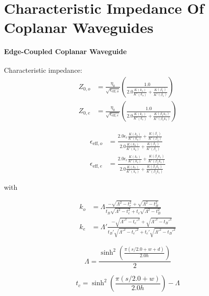 \section{Characteristic Impedance Of Coplanar Waveguides} \label{app:waveguides}
\paragraph{Edge-Coupled Coplanar Waveguide}

Characteristic impedance\cite[~p197-198]{wadell}: 
\begin{align}
	Z_{0,o} &= \frac{\eta_0}{\sqrt{\epsilon_{\text{eff},o}}} \left( \frac{1.0}{2.0 \frac{K(k_o)}{K'(k_o)} + \frac{K(\beta_1)}{K'(\beta_1)}}\right)\\
	Z_{0,e} &= \frac{\eta_0}{\sqrt{\epsilon_{\text{eff},e}}} \left( \frac{1.0}{2.0 \frac{K(k_e)}{K'(k_e)} + \frac{K(\beta_1 k_1)}{K'(\beta_1 k_1)}}\right)
\end{align}    








\begin{align}
	\epsilon_{\text{eff},o} &= \frac{2.0 \epsilon_r \frac{K(k_o)}{K'(k_o)} + \frac{K(\beta_1)}{K'(\beta_1)}}{2.0 \frac{K(k_o)}{K'(k_o)} + \frac{K(\beta_1)}{K'(\beta_1)}}\\
	\epsilon_{\text{eff},e} &= \frac{2.0 \epsilon_r \frac{K(k_e)}{K'(k_e)} + \frac{K(\beta_1 k_1)}{K'(\beta_1 k_1)}}{2.0 \frac{K(k_e)}{K'(k_e)} + \frac{K(\beta_1 k_1)}{K'(\beta_1 k_1)}}
\end{align}

with

\begin{align}
	k_o &= \Lambda \frac{-\sqrt{\Lambda^2 - t_c^2} + \sqrt{\Lambda^2 - t_B^2}}{t_B\sqrt{\Lambda^2 - t_c^2} + t_c \sqrt{\Lambda^2 - t_B^2}}\\
	k_e &= \Lambda' \frac{-\sqrt{\Lambda'^2 - t_c'^2} + \sqrt{\Lambda'^2 - t_B'^2}}{t_B'\sqrt{\Lambda'^2 - t_c'^2} + t_c' \sqrt{\Lambda'^2 - t_B'^2}}
\end{align}


\begin{equation}
	\Lambda = \frac{\sinh^2 \left( \frac{\pi (s/2.0 + w + d)}{2.0 h} \right) }{2}
\end{equation}

\begin{equation}
	t_c = \sinh^2 \left( \frac{\pi (s/2.0 + w)}{2.0 h} \right) - \Lambda
\end{equation}

